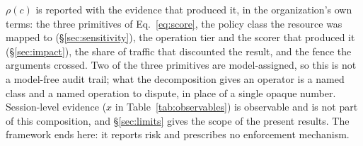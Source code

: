 \documentclass[sigconf]{acmart}
\begin{document}
$\rho(c)$ is reported with the evidence that produced it, in the organization's
own terms: the three primitives of Eq.~\ref{eq:score}, the policy class the
resource was mapped to (\S\ref{sec:sensitivity}), the operation tier and the
scorer that produced it (\S\ref{sec:impact}), the share of traffic that
discounted the result, and the fence the arguments crossed. Two of the three
primitives are model-assigned, so this is not a model-free audit trail; what
the decomposition gives an operator is a named class and a named operation to
dispute, in place of a single opaque number. Session-level evidence ($x$ in
Table~\ref{tab:observables}) is observable and is not part of this composition,
and \S\ref{sec:limits} gives the scope of the present results. The
framework ends here: it reports risk and prescribes no enforcement mechanism.





\nocite{*}

\balance


\end{document}
